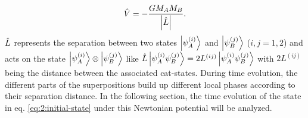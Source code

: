 \begin{equation}\label{eq:2:newtonian-potential}
  \hat{V} = -\frac{G M_A M_B}{\left\lvert\hat{L}\right\rvert} .
\end{equation}
$\hat{L}$ represents the separation between two states $\ket{\psi^{(i)}_A}$ and $\ket{\psi^{(j)}_B}$ ($i,j=1,2$) and acts on the state $\ket{\psi^{(i)}_A} \otimes \ket{\psi^{(j)}_B}$ like $\hat{L} \ket{\psi^{(i)}_A \psi^{(j)}_B} = 2L^{(ij)}\ket{\psi^{(i)}_A \psi^{(j)}_B}$ with $2L^{(ij)}$ being the distance between the associated cat-states.
During time evolution, the different parts of the superpositions build up different local phases according to their separation distance.  In the following section, the time evolution of the state in eq. \eqref{eq:2:initial-state} under this Newtonian potential will be analyzed.







